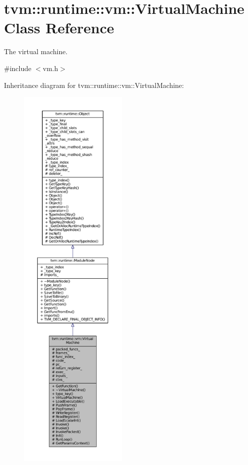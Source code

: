\hypertarget{classtvm_1_1runtime_1_1vm_1_1VirtualMachine}{}\section{tvm\+:\+:runtime\+:\+:vm\+:\+:Virtual\+Machine Class Reference}
\label{classtvm_1_1runtime_1_1vm_1_1VirtualMachine}


The virtual machine.  




{\ttfamily \#include $<$vm.\+h$>$}



Inheritance diagram for tvm\+:\+:runtime\+:\+:vm\+:\+:Virtual\+Machine\+:
\nopagebreak
\begin{figure}[H]
\begin{center}
\leavevmode
\includegraphics[height=550pt]{classtvm_1_1runtime_1_1vm_1_1VirtualMachine__inherit__graph}
\end{center}
\end{figure}


